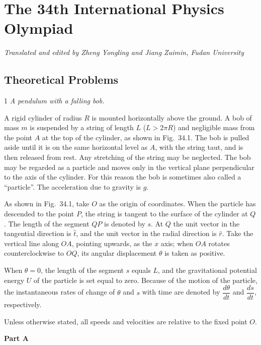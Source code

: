 \section*{The 34th International Physics Olympiad}

\begin{center}
\emph{Translated and edited by Zheng Yongling and Jiang Zuimin, Fudan University}
\end{center}

\subsection*{Theoretical Problems}

\begin{problem}{1}
\emph{A pendulum with a falling bob.}

A rigid cylinder of radius $R$ is mounted horizontally above the ground. A bob of mass $m$ is suspended by a string of length $L$ ($L>2\pi R$) and negligible mass from the point $A$ at the top of the cylinder, as shown in Fig.~34.1. The bob is pulled aside until it is on the same horizontal level as $A$, with the string taut, and is then released from rest. Any stretching of the string may be neglected. The bob may be regarded as a particle and moves only in the vertical plane perpendicular to the axis of the cylinder. For this reason the bob is sometimes also called a ``particle''. The acceleration due to gravity is $g$.

As shown in Fig.~34.1, take $O$ as the origin of coordinates. When the particle has descended to the point $P$, the string is tangent to the surface of the cylinder at $Q$. The length of the segment $QP$ is denoted by $s$. At $Q$ the unit vector in the tangential direction is $\hat{t}$, and the unit vector in the radial direction is $\hat{r}$. Take the vertical line along $OA$, pointing upwards, as the $x$ axis; when $OA$ rotates counterclockwise to $OQ$, its angular displacement $\theta$ is taken as positive.

When $\theta=0$, the length of the segment $s$ equals $L$, and the gravitational potential energy $U$ of the particle is set equal to zero. Because of the motion of the particle, the instantaneous rates of change of $\theta$ and $s$ with time are denoted by $\dfrac{d\theta}{dt}$ and $\dfrac{ds}{dt}$, respectively.

Unless otherwise stated, all speeds and velocities are relative to the fixed point $O$.

\textbf{Part A}


\end{problem}
